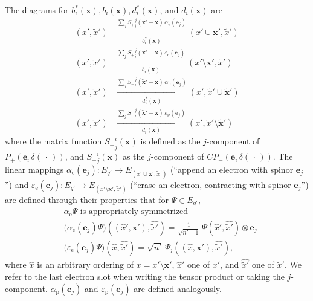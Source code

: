 \documentclass[12pt]{article}
\newcommand{\1}{\mathbf{1}} %
\newcommand{\Dindex}{i} %
\newcommand{\Dindextwo}{j} %
\newcommand{\ve}{{\boldsymbol e}}
\newcommand{\vx}{{\boldsymbol x}} %
\newcommand{\pvx}{{\widetilde{\vx}}}
\newcommand{\px}{{\widetilde{x}}}
\newcommand{\el}{\mathrm{e}} %
\newcommand{\pos}{\mathrm{p}} %
\begin{document}
The diagrams for $b^*_\Dindex(\vx),b_\Dindex(\vx),d^*_\Dindex(\vx)$,
and $d_\Dindex(\vx)$ are
\begin{subequations}
\begin{align}
   (x',\px') &\xrightarrow [b^*_\Dindex(\vx)]
   {\sum_\Dindextwo {S_+}^{\Dindextwo}_{\Dindex} (\vx' - \vx) \,
   \alpha_\el(\ve_\Dindextwo)} (x'\cup \vx',\px')\\
   (x',\px') &\xrightarrow [b_\Dindex(\vx)]
   {\sum_\Dindextwo {S_+}^{\Dindextwo}_{\Dindex} (\vx' - \vx) \,
   \varepsilon_\el(\ve_\Dindextwo)} (x'\setminus \vx',\px')\\
   (x',\px') &\xrightarrow [d^*_\Dindex(\vx)]
   {\sum_\Dindextwo {S_-}^{\Dindextwo}_{\Dindex} (\pvx' - \vx) \,
   \alpha_\pos(\ve_\Dindextwo)} (x',\px'\cup \pvx')\\
   (x',\px') &\xrightarrow [d_\Dindex(\vx)]
   {\sum_\Dindextwo {S_-}^{\Dindextwo}_{\Dindex} (\pvx' - \vx) \,
   \varepsilon_\pos(\ve_\Dindextwo)} (x',\px'\setminus \pvx')
\end{align}
\end{subequations}
where the matrix function ${S_+}_\Dindextwo^\Dindex (\vx)$ is defined
as the $\Dindextwo$-component of $P_+ (\ve_\Dindex \,
\delta(\,\cdot\,))$, and ${S_-}_\Dindextwo^\Dindex (\vx)$ as the
$\Dindextwo$-component of $CP_- (\ve_\Dindex \, \delta(\,\cdot\,))$.
The linear mappings $\alpha_\el(\ve_\Dindextwo): E_{q'} \to E_{(x'
\cup \vx',\px')}$ (``append an electron with spinor
$\ve_\Dindextwo$'') and $\varepsilon_\el(\ve_\Dindextwo): E_{q'} \to
E_{(x' \setminus \vx',\px')}$ (``erase an electron, contracting with
spinor $\ve_\Dindextwo$'') are defined through their properties that
for $\Psi \in E_{q'}$,
\begin{subequations}
\begin{align}
   &\alpha_\el \Psi \text{ is appropriately symmetrized} \\
   &\big(\alpha_\el(\ve_\Dindextwo) \Psi\big) ((\hat{x}', 
\vx'),\hat{\px'})
=
   \frac{1}{\sqrt{n'+1}} \, \Psi(\hat{x}',\hat{\px'}) \otimes
   \ve_\Dindextwo \\
   &\big(\varepsilon_\el(\ve_\Dindextwo) \Psi\big) (\hat{x}, \hat{\px'}) 
=
   \sqrt{n'} \, \Psi_\Dindextwo ((\hat{x}, \vx'),\hat{\px'}),
\end{align}
\end{subequations}
where $\hat{x}$ is an arbitrary  ordering of $x=x' \setminus \vx'$,
$\hat{x}'$ one of $x'$, and $\hat{\px'}$ one of $\px'$. We refer to
the last electron slot when writing the tensor product or taking the
$\Dindextwo$-component.  $\alpha_\pos (\ve_\Dindextwo)$ and
$\varepsilon_\pos(\ve_\Dindextwo)$ are defined analogously.
\end{document}
